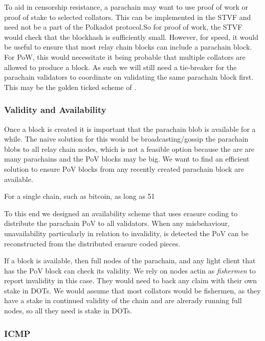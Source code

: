 To aid in censorship resistance, a parachain may want to use proof of work or proof of stake to selected collators. This can be implemented in the STVF and need not be a part of the Polkadot protocol.So for proof of work, the STVF would check that the blockhash is sufficiently small. However, for speed, it would be useful to ensure that most relay chain blocks can include a parachain block. For PoW, this would necessitate it being probable that multiple collators are allowed to produce a block. As such we will still need a tie-breaker for the parachain validators to coordinate on validating the same parachain block first. This may be the golden ticked scheme of \cite{spottypaper}.


\subsubsection{Validity and Availability} \label{sec:validity-and-availability}
Once a block is created it is important that the parachain blob is available for a while.
The naive solution for this would be broadcasting/gossip the parachain blobs to all relay chain nodes, which is not a feasible option because the are are many parachains and the PoV blocks may be big.
We want to find an efficient solution to ensure PoV blocks from any recently created parachain block are available.

For a single chain, such as bitcoin, as long as 51%

To this end we designed an availability scheme that uses erasure coding \cite{} to distribute the parachain PoV to all validators.
When any misbehaviour, unavailability particularly in relation to invalidity, is detected the PoV can be reconstructed from the distributed erasure coded pieces.

If a block is available, then full nodes of the parachain, and any light client that has the PoV block can check its validity. We rely on nodes actin as {\em fishermen} to report invalidity in this case. They would need to back any claim with their own stake in DOTs. We would assume that most collators would be fishermen, as they have a stake in continued validity of the chain and are alrerady running full nodes, so all they need is stake in DOTs.

\subsubsection{ICMP} \label{sec:ICMP}
